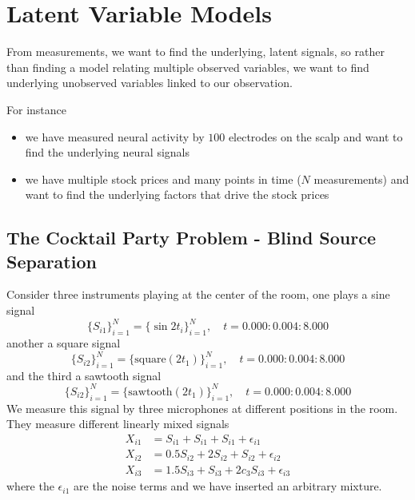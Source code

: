 \section{Latent Variable Models}
\thispagestyle{plain}

From measurements, we want to find the underlying, latent signals, so rather
than finding a model relating multiple observed variables, we want to find
underlying unobserved variables linked to our observation.

For instance
\begin{itemize}
    \item we have measured neural activity by $100$ electrodes on the scalp and want to find the underlying neural signals
    \item we have multiple stock prices and many points in time ($N$ measurements) and want to find the underlying factors that drive the stock prices
\end{itemize}

\subsection{The Cocktail Party Problem - Blind Source Separation}
Consider three instruments playing at the center of the room, one plays a sine signal
\begin{equation}
    \{S_{i1}\}_{i=1}^N = \{ \sin 2t_i \}_{i=1}^N, \quad t = 0.000:0.004:8.000
\end{equation}
another a square signal
\begin{equation}
    \{S_{i2}\}_{i=1}^N = \{ \text{square}(2t_1) \}_{i=1}^N, \quad t = 0.000:0.004:8.000
\end{equation}
and the third a sawtooth signal
\begin{equation}
    \{S_{i2}\}_{i=1}^N = \{ \text{sawtooth}(2t_1) \}_{i=1}^N, \quad t = 0.000:0.004:8.000
\end{equation}
We measure this signal by three microphones at different positions in the room. They measure different
linearly mixed signals
\begin{equation}
    \begin{aligned}
        X_{i1} &= S_{i1} + S_{i1} + S_{i1} + \epsilon_{i1} \\
        X_{i2} &= 0.5 S_{i2} + 2 S_{i2} + S_{i2} + \epsilon_{i2} \\
        X_{i3} &= 1.5 S_{i3} + S_{i3} + 2 c_3 S_{i3} + \epsilon_{i3}
    \end{aligned}
\end{equation}
where the $\epsilon_{i1}$ are the noise terms and we have inserted an arbitrary mixture.

